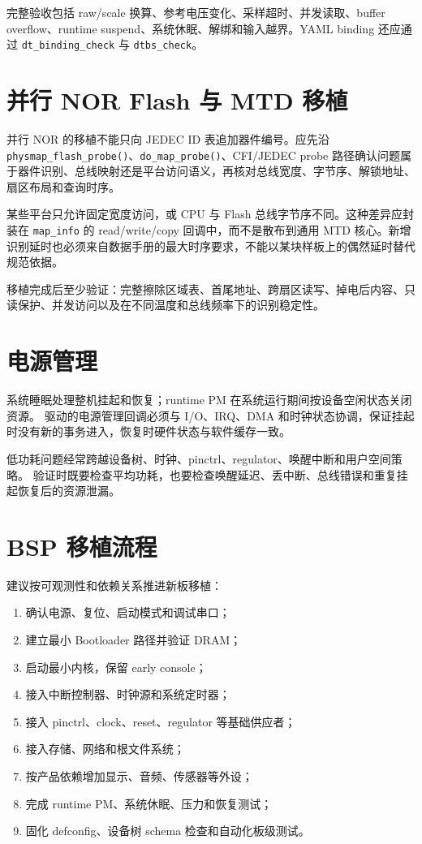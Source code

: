 完整验收包括 raw/scale 换算、参考电压变化、采样超时、并发读取、buffer overflow、runtime suspend、系统休眠、解绑和输入越界。YAML binding 还应通过 \texttt{dt\_binding\_check} 与 \texttt{dtbs\_check}。

\section{并行 NOR Flash 与 MTD 移植}

并行 NOR 的移植不能只向 JEDEC ID 表追加器件编号。应先沿 \texttt{physmap\_flash\_probe()}、\texttt{do\_map\_probe()}、CFI/JEDEC probe 路径确认问题属于器件识别、总线映射还是平台访问语义，再核对总线宽度、字节序、解锁地址、扇区布局和查询时序。

某些平台只允许固定宽度访问，或 CPU 与 Flash 总线字节序不同。这种差异应封装在 \texttt{map\_info} 的 read/write/copy 回调中，而不是散布到通用 MTD 核心。新增识别延时也必须来自数据手册的最大时序要求，不能以某块样板上的偶然延时替代规范依据。

移植完成后至少验证：完整擦除区域表、首尾地址、跨扇区读写、掉电后内容、只读保护、并发访问以及在不同温度和总线频率下的识别稳定性。

\section{电源管理}

系统睡眠处理整机挂起和恢复；runtime PM 在系统运行期间按设备空闲状态关闭资源。
驱动的电源管理回调必须与 I/O、IRQ、DMA 和时钟状态协调，保证挂起时没有新的事务进入，恢复时硬件状态与软件缓存一致。

低功耗问题经常跨越设备树、时钟、pinctrl、regulator、唤醒中断和用户空间策略。
验证时既要检查平均功耗，也要检查唤醒延迟、丢中断、总线错误和重复挂起恢复后的资源泄漏。

\section{BSP 移植流程}

建议按可观测性和依赖关系推进新板移植：
\begin{enumerate}
  \item 确认电源、复位、启动模式和调试串口；
  \item 建立最小 Bootloader 路径并验证 DRAM；
  \item 启动最小内核，保留 early console；
  \item 接入中断控制器、时钟源和系统定时器；
  \item 接入 pinctrl、clock、reset、regulator 等基础供应者；
  \item 接入存储、网络和根文件系统；
  \item 按产品依赖增加显示、音频、传感器等外设；
  \item 完成 runtime PM、系统休眠、压力和恢复测试；
  \item 固化 defconfig、设备树 schema 检查和自动化板级测试。
\end{enumerate}

